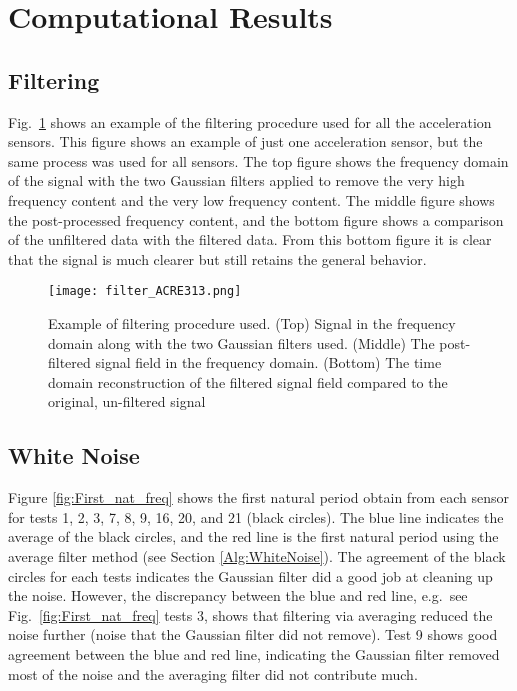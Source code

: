 \documentclass{article}
\begin{document}
\FloatBarrier
\section{Computational Results}

\subsection{Filtering}

Fig.\  \ref{fig:filter} shows an example of the filtering procedure used for all the acceleration sensors. This figure shows an example of just one acceleration sensor, but the same process was used for all sensors. The top figure shows the frequency domain of the signal with the two Gaussian filters applied to remove the very high frequency content and the very low frequency content. The middle figure shows the post-processed frequency content, and the bottom figure shows a comparison of the unfiltered data with the filtered data. From this bottom figure it is clear that the signal is much clearer but still retains the general behavior. 

\begin{figure}[!htb]
    \centering
    \texttt{[image: filter\_ACRE313.png]}
    \caption{Example of filtering procedure used. (Top) Signal in the frequency domain along with the two Gaussian filters used. (Middle) The post-filtered signal field in the frequency domain. (Bottom) The time domain reconstruction of the filtered signal field compared to the original, un-filtered signal}
    \label{fig:filter}
\end{figure}

\FloatBarrier
\subsection{White Noise}

Figure \ref{fig:First_nat_freq} shows the first natural period obtain from each sensor for tests 1, 2, 3, 7, 8, 9, 16, 20, and 21 (black circles). The blue line indicates the average of the black circles, and the red line is the first natural period using the average filter method (see Section \ref{Alg:WhiteNoise}). The agreement of the black circles for each tests indicates the Gaussian filter did a good job at cleaning up the noise. However, the discrepancy between the blue and red line, e.g.\ see Fig.\ \ref{fig:First_nat_freq} tests 3, shows that filtering via averaging reduced the noise further (noise that the Gaussian filter did not remove). Test 9 shows good agreement between the blue and red line, indicating the Gaussian filter removed most of the noise and the averaging filter did not contribute much.
\end{document}
